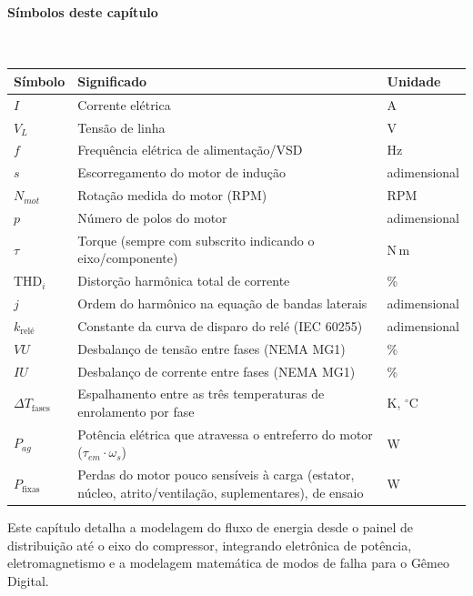 \documentclass[12pt,a4paper]{article}
\numberwithin{equation}{section}
\numberwithin{table}{section}
\numberwithin{figure}{section}
\begin{document}
\paragraph{Símbolos deste capítulo}\mbox{}\\[-0.5em]
{\small
\begin{longtable}{>{\raggedright\arraybackslash}p{2.6cm} >{\raggedright\arraybackslash}p{9.2cm} >{\raggedright\arraybackslash}p{2.6cm}}
	\toprule
	\textbf{Símbolo} & \textbf{Significado} & \textbf{Unidade} \\ \midrule
	\endhead
	$I$ & Corrente elétrica & A \\
	$V_L$ & Tensão de linha & V \\
	$f$ & Frequência elétrica de alimentação/VSD & Hz \\
	$s$ & Escorregamento do motor de indução & adimensional \\
	$N_{mot}$\dag & Rotação medida do motor (RPM) & RPM \\
	$p$ & Número de polos do motor & adimensional \\
	$\tau$ & Torque (sempre com subscrito indicando o eixo/componente) & N\,m \\
	$\text{THD}_i$ & Distorção harmônica total de corrente & \% \\
	$j$\dag & Ordem do harmônico na equação de bandas laterais & adimensional \\
	$k_{\text{relé}}$\dag & Constante da curva de disparo do relé (IEC 60255) & adimensional \\
	$VU$ & Desbalanço de tensão entre fases (NEMA MG1) & \% \\
	$IU$ & Desbalanço de corrente entre fases (NEMA MG1) & \% \\
	$\Delta T_{\text{fases}}$ & Espalhamento entre as três temperaturas de enrolamento por fase & K, $^{\circ}$C \\
	$P_{ag}$ & Potência elétrica que atravessa o entreferro do motor ($\tau_{em}\cdot\omega_s$) & W \\
	$P_{\text{fixas}}$ & Perdas do motor pouco sensíveis à carga (estator, núcleo, atrito/ventilação, suplementares), de ensaio & W \\
	\bottomrule
\end{longtable}
}




	
	Este capítulo detalha a modelagem do fluxo de energia desde o painel de distribuição até o eixo do compressor, integrando eletrônica de potência, eletromagnetismo e a modelagem matemática de modos de falha para o Gêmeo Digital.
	
\end{document}
